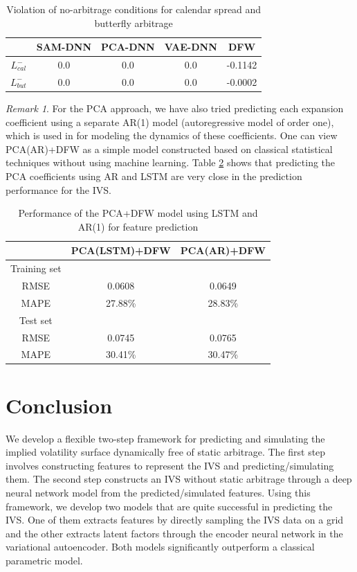 \documentclass[11pt,a4paper]{article}
\theoremstyle{remark}
\newtheorem{remark}{Remark}
\begin{document}
\begin{table}[htbp!]
	\centering
	\begin{tabular}{ccccc}
		\hline
		& SAM-DNN       &PCA-DNN     &VAE-DNN & DFW \\
		\hline
		$L_{cal}^- $       & 0.0 &0.0   &0.0&  -0.1142\\
		$L_{but}^- $      & 0.0 &0.0     &0.0 & -0.0002 \\		
		\hline
	\end{tabular}%
	\caption{Violation of no-arbitrage conditions for calendar spread and butterfly arbitrage}
	\label{tab:violation}%
\end{table}%


\begin{remark}\label{remk:PCA-OU}
	For the PCA approach, we have also tried predicting each expansion coefficient using a separate AR(1) model (autoregressive model of order one), which is used in \cite{cont2002dynamics} for modeling the dynamics of these coefficients. One can view PCA(AR)+DFW as a simple model constructed based on classical statistical techniques without using machine learning. Table \ref{tab:LSTM-AR} shows that predicting the PCA coefficients using AR and LSTM are very close in the prediction performance for the IVS.
	\begin{table}[htbp!]
		\centering
		\begin{tabular}{ccc}
			\hline
			& PCA(LSTM)+DFW   & PCA(AR)+DFW \\
			\hline
			Training set&         &          \\
			RMSE&  0.0608  &   0.0649   \\
			MAPE&27.88\%   &  28.83\%    \\
			\hline
			Test set&         &            \\
			RMSE&  0.0745       & 0.0765     \\
			MAPE&  30.41\%       &  30.47\%    \\
			\hline
		\end{tabular}%
		\caption{Performance of the PCA+DFW model using LSTM and AR(1) for feature prediction}
		\label{tab:LSTM-AR}%
	\end{table}%
\end{remark}

\section{Conclusion}\label{sec:conclusion}
We develop a flexible two-step framework for predicting and simulating the implied volatility surface dynamically free of static arbitrage. The first step involves constructing features to represent the IVS and predicting/simulating them. The second step constructs an IVS without static arbitrage through a deep neural network model from the predicted/simulated features. Using this framework, we develop two models that are quite successful in predicting the IVS. One of them extracts features by directly sampling the IVS data on a grid and the other extracts latent factors through the encoder neural network in the variational autoencoder. Both models significantly outperform a classical parametric model. 
\end{document}
